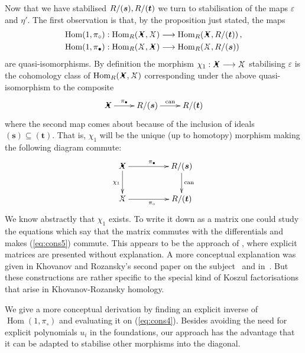 \documentclass{compositio}
\theoremstyle{definition}
\numberwithin{equation}{section}
\def\can{\operatorname{can}}
\def\Hom{\operatorname{Hom}}
\begin{document}
Now that we have stabilised $R/(\boldsymbol{s}), R/(\boldsymbol{t})$ we turn to stabilisation of the maps $\varepsilon$ and $\eta'$. The first observation is that, by the proposition just stated, the maps
\begin{align*}
\Hom(1,\pi_{\circ})&: \Hom_R(\Xbul, \Xcirc) \lto \Hom_R(\Xbul, R/(\boldsymbol{t})) \, , \\
\Hom(1,\pi_{\bullet})&: \Hom_R(\Xcirc, \Xbul) \lto \Hom_R(\Xcirc, R/(\boldsymbol{s}))
\end{align*}
are quasi-isomorphisms. By definition the morphism $\chi_1: \Xbul \lto \Xcirc$ stabilising $\varepsilon$ is the cohomology class of $\Hom_R(\Xbul, \Xcirc)$ corresponding under the above quasi-isomorphism to the composite
\begin{equation}\label{eq:cons4}
\xymatrix{
\Xbul \ar[r]^-{\pi_{\bullet}} & R/(\boldsymbol{s}) \ar[r]^-{\can} & R/(\boldsymbol{t})
}
\end{equation}
where the second map comes about because of the inclusion of ideals $(\boldsymbol{s}) \subseteq (\boldsymbol{t})$. That is, $\chi_1$ will be the unique (up to homotopy) morphism making the following diagram commute:
\begin{equation}\label{eq:cons5}
\xymatrix@C+2pc{
\Xbul \ar[d]_{\chi_1} \ar[r]^{\pi_{\bullet}} & R/(\boldsymbol{s}) \ar[d]^{\can}\\
\Xcirc \ar[r]_{\pi_{\circ}} & R/(\boldsymbol{t})
}
\end{equation}
We know abstractly that $\chi_1$ exists. To write it down as a matrix one could study the equations which say that the matrix commutes with the differentials and makes (\ref{eq:cons5}) commute. This appears to be the approach of \cite{kr0401268}, where explicit matrices are presented without explanation. A more conceptual explanation was given in Khovanov and Rozansky's second paper on the subject~\cite{kr0505056} and in~\cite{w0907.0695}. But these constructions are rather specific to the special kind of Koszul factorisations that arise in Khovanov-Rozansky homology. 

We give a more conceptual derivation by finding an explicit inverse of $\Hom(1,\pi_{\circ})$ and evaluating it on (\ref{eq:cons4}). Besides avoiding the need for explicit polynomials $u_i$ in the foundations, our approach has the advantage that it can be adapted to stabilise other morphisms into the diagonal.
\end{document}
